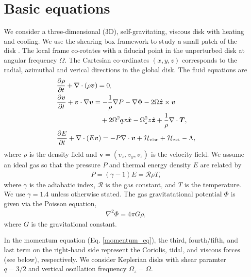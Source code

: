 \section{Basic equations}\label{basic}
We consider a three-dimensional (3D), self-gravitating,
viscous disk with heating and cooling. We use the shearing box framework to
study a small patch of the disk \citep{goldreich65}. The local frame
co-rotates with a fiducial point in the unperturbed disk at angular
frequency $\Omega$. The Cartesian co-ordinates $(x,y,z)$ corresponds
to the radial, azimuthal and verical directions in the global disk. 
The fluid equations are
\begin{align}
  &\frac{\p\rho}{\p t} + \nabla\cdot\left(\rho\bm{v}\right) = 0, \\
  & \frac{\p\bm{v}}{\p t} + \bm{v}\cdot\nabla\bm{v} =
  -\frac{1}{\rho}\nabla P - \nabla\Phi - 2\Omega\hat{\bm{z}}\times\bm{v}\notag\\ & 
  \phantom{\frac{\p\bm{v}}{\p t} + \bm{v}\cdot\nabla\bm{v} =}
  +2\Omega^2qx\hat{\bm{x}} -\Omega_z^2z\hat{\bm{z}} 
   + \frac{1}{\rho}\nabla\cdot\bm{T},\label{momentum_eq}\\
  & \frac{\p E}{\p t} + \nabla\cdot\left(E\bm{v}\right) = - P
  \nabla\cdot\bm{v} + \mathcal{H}_\mathrm{visc} +
  \mathcal{H}_\mathrm{ext} - \Lambda,\label{energy_eq}
\end{align} 
where $\rho$ is the density field and $\bm{v} = (v_x, v_y, v_z)$ is
the velocity field.%
We assume an ideal gas so that the pressure $P$ and thermal energy
density $E$ are related by  
\begin{align}
  P = (\gamma-1)E = \mathcal{R}\rho T, 
\end{align}
where $\gamma$ is the adiabatic index, $\mathcal{R}$ is the gas
constant, and $T$ is the temperature. We use $\gamma=1.4$ unless
otherwise stated. The gas 
gravitatational potential $\Phi$ is given via the Poisson equation,  
\begin{align}
 \nabla^2\Phi = 4 \pi G \rho, 
\end{align}
where $G$ is the gravitational constant.  

In the momentum equation (Eq. \ref{momentum_eq}), the third,
fourth/fifth, and last term on the right-hand side represent the Coriolis, 
tidal, and viscous forces (see below), respectively. We consider    
Keplerian disks with shear paramter $q=3/2$ and vertical oscillation 
frequency $\Omega_z=\Omega$.  


